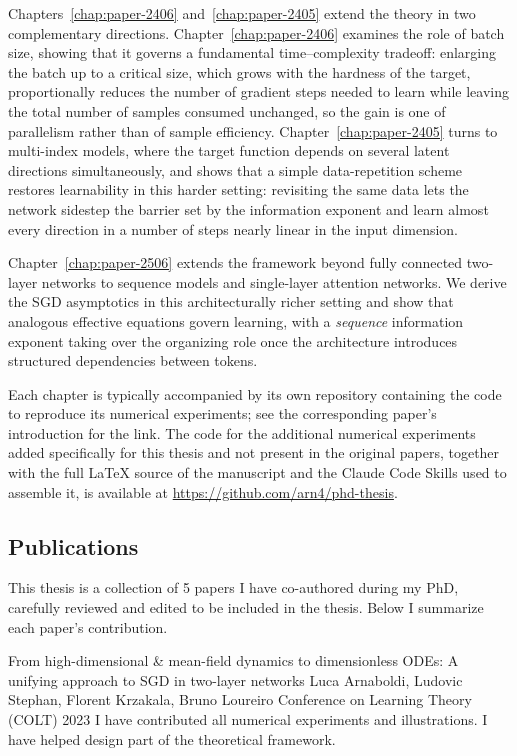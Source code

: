 Chapters~\ref{chap:paper-2406} and~\ref{chap:paper-2405} extend the theory in two
complementary directions.
Chapter~\ref{chap:paper-2406} examines the role of
batch size, showing that it governs a fundamental time--complexity tradeoff: enlarging the
batch up to a critical size, which grows with the hardness of the target, proportionally
reduces the number of gradient steps needed to learn while leaving the total number of
samples consumed unchanged, so the gain is one of parallelism rather than of sample
efficiency.
Chapter~\ref{chap:paper-2405} turns to multi-index models, where the target function
depends on several latent directions simultaneously, and shows that a simple
data-repetition scheme restores learnability in this harder setting: revisiting the same
data lets the network sidestep the barrier set by the information exponent and learn almost
every direction in a number of steps nearly linear in the input dimension.

Chapter~\ref{chap:paper-2506} extends the framework beyond fully connected two-layer
networks to sequence models and single-layer attention networks.
We derive the SGD asymptotics in this architecturally richer setting and show that
analogous effective equations govern learning, with a \emph{sequence} information exponent
taking over the organizing role once the architecture introduces structured dependencies
between tokens.

Each chapter is typically accompanied by its own repository containing the code to reproduce its numerical experiments; see the corresponding paper's introduction for the link. The code for the additional numerical experiments added specifically for this thesis and not present in the original papers, together with the full \LaTeX{} source of the manuscript and the Claude Code Skills used to assemble it, is available at \url{https://github.com/arn4/phd-thesis}.

\subsection*{Publications}
This thesis is a collection of 5 papers I have co-authored during my PhD, carefully reviewed and edited to be included in the thesis.
Below I summarize each paper's contribution.

\begin{contribution}
  {From high-dimensional \& mean-field dynamics to dimensionless ODEs:
   A unifying approach to SGD in two-layer networks}
  {Luca Arnaboldi, Ludovic Stephan, Florent Krzakala, Bruno Loureiro}
  {Conference on Learning Theory (COLT) 2023}
  {}
  I have contributed all numerical experiments and illustrations.
  I have helped design part of the theoretical framework.
\end{contribution}

